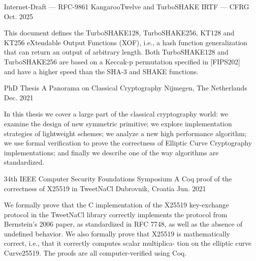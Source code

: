 {}


\begin{cventries}

	\cventry
	{Internet-Draft --- RFC-9861}
	{KangarooTwelve and TurboSHAKE} %
	{IRTF --- CFRG} %
	{Oct. 2025} %
	{
		\begin{cvitems} %
			\item {This document defines the TurboSHAKE128, TurboSHAKE256, KT128 and KT256 eXtendable Output Functions (XOF),
			i.e., a hash function generalization that can return an output of arbitrary length.
			Both TurboSHAKE128 and TurboSHAKE256 are based on a Keccak-p permutation specified in [FIPS202]
			and have a higher speed than the SHA-3 and SHAKE functions.\\}
		\end{cvitems}
	}
	
	\cventry
	{PhD Thesis}
	{A Panorama on Classical Cryptography}
	{Nijmegen, The Netherlands} %
	{Dec. 2021} %
	{
		\begin{cvitems} %
			\item {In this thesis we cover a large part of the classical cryptography world: we examine the design of new symmetric primitive; we explore implementation strategies of lightweight schemes; we analyze a new high performance algorithm; we use formal verification to prove the correctness of Elliptic Curve Cryptography implementations; and finally we describe one of the way algorithms are standardized.\\}
		\end{cvitems}
	}	%

	\cventry
	{34th IEEE Computer Security Foundations Symposium}
	{A Coq proof of the correctness of X25519 in TweetNaCl} %
	{Dubrovnik, Croatia} %
	{Jun. 2021} %
	{
		\begin{cvitems} %
			\item {We formally prove that the C implementation of the X25519
			            key-exchange protocol in the TweetNaCl library correctly implements the protocol from Bernstein’s 2006 paper, as standardized in RFC 7748, as well
			            as the absence of undefined behavior. We also formally prove that X25519 is mathematically correct, i.e., that it correctly computes scalar multiplica-
			            tion on the elliptic curve Curve25519. The proofs are all computer-verified using Coq.\\}
		\end{cvitems}
	}


\end{cventries}
